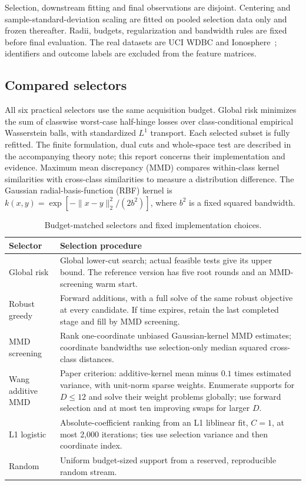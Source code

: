 \documentclass[11pt,a4paper]{article}
\begin{document}
Selection, downstream fitting and final observations are disjoint. Centering and
sample-standard-deviation scaling are fitted on pooled selection data only and
frozen thereafter. Radii, budgets, regularization and bandwidth rules are fixed
before final evaluation. The real datasets are UCI WDBC and Ionosphere~\cite{wdbc,ionosphere};
identifiers and outcome labels are excluded from the feature matrices.

\subsection{Compared selectors}
All six practical selectors use the same acquisition budget. Global risk minimizes
the sum of classwise worst-case half-hinge losses over class-conditional empirical
Wasserstein balls, with standardized $L^1$ transport. Each selected subset is fully
refitted. The finite formulation, dual cuts and whole-space test are described in
the accompanying theory note; this report concerns their implementation and evidence.
Maximum mean discrepancy (MMD) compares within-class kernel similarities with
cross-class similarities to measure a distribution difference. The Gaussian
radial-basis-function (RBF) kernel is
$k(x,y)=\exp[-\|x-y\|_2^2/(2b^2)]$, where $b^2$ is a fixed squared bandwidth.
\begin{table}[htbp]\centering\small
\caption{Budget-matched selectors and fixed implementation choices.}\label{tab:selectors}
\begin{tabularx}{\linewidth}{@{}p{26mm}Y@{}}\toprule
Selector & Selection procedure\\\midrule
Global risk & Global lower-cut search; actual feasible tests give its upper bound. The reference version has five root rounds and an MMD-screening warm start.\\
Robust greedy & Forward additions, with a full solve of the same robust objective at every candidate. If time expires, retain the last completed stage and fill by MMD screening.\\
MMD screening & Rank one-coordinate unbiased Gaussian-kernel MMD estimates; coordinate bandwidths use selection-only median squared cross-class distances.\\
Wang additive MMD & Paper criterion: additive-kernel mean minus $0.1$ times estimated variance, with unit-norm sparse weights. Enumerate supports for $D\le12$ and solve their weight problems globally; use forward selection and at most ten improving swaps for larger $D$.\\
L1 logistic & Absolute-coefficient ranking from an L1 liblinear fit, $C=1$, at most 2,000 iterations; ties use selection variance and then coordinate index.\\
Random & Uniform budget-sized support from a reserved, reproducible random stream.\\\bottomrule
\end{tabularx}\end{table}
\end{document}

